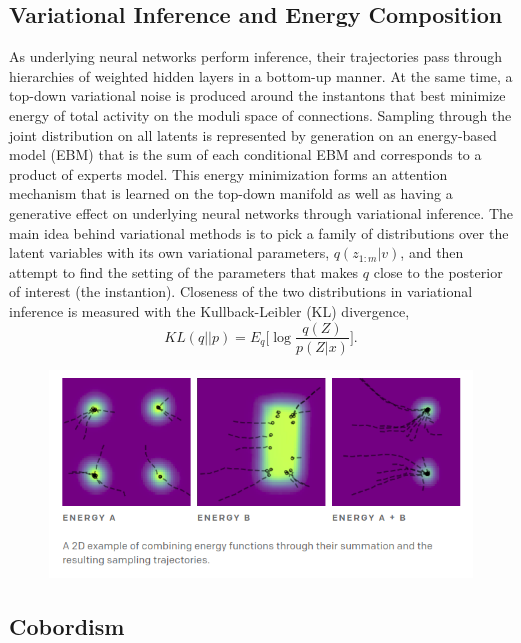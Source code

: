 \documentclass{article}
\begin{document}
\subsection{Variational Inference and Energy Composition}
    As underlying neural networks perform inference, their trajectories pass through hierarchies of weighted hidden layers in a bottom-up manner. At the same time, a top-down variational noise is produced around the instantons that best minimize energy of total activity on the moduli space of connections. Sampling through the joint distribution on all latents is represented by generation on an energy-based model (EBM) that is the sum of each conditional EBM and corresponds to a product of experts model. This energy minimization forms an attention mechanism that is learned on the top-down manifold as well as having a generative effect on underlying neural networks through variational inference. The main idea behind variational methods is to pick a family of distributions over the latent variables with its own variational parameters, $q(z_{1:m} | v)$, and then attempt to find the setting of the parameters that makes $q$ close to the posterior of interest (the instantion). Closeness of the two distributions in variational inference is measured with the Kullback-Leibler (KL) divergence, 
    \[
        KL(q||p)=  E_q\bigg[ \log \frac{ q(Z)}{p(Z | x)} \bigg].
    \]
    \begin{figure}[h]
        \centering
        \includegraphics[width=13cm]{openai-ebm.png}
    \end{figure}
    
    \subsection{Cobordism}
    
\end{document}
